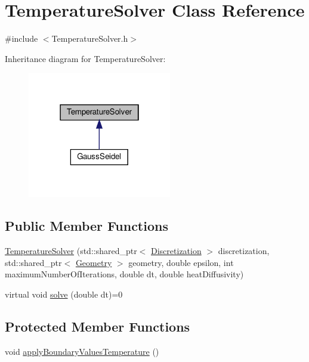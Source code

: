 \hypertarget{classTemperatureSolver}{}\section{Temperature\+Solver Class Reference}
\label{classTemperatureSolver}


{\ttfamily \#include $<$Temperature\+Solver.\+h$>$}



Inheritance diagram for Temperature\+Solver\+:\nopagebreak
\begin{figure}[H]
\begin{center}
\leavevmode
\includegraphics[width=178pt]{classTemperatureSolver__inherit__graph}
\end{center}
\end{figure}
\subsection*{Public Member Functions}
\begin{DoxyCompactItemize}
\item 
\mbox{\hyperlink{classTemperatureSolver_a8e3ca429cd802f7d8753f6e08cb70010}{Temperature\+Solver}} (std\+::shared\+\_\+ptr$<$ \mbox{\hyperlink{classDiscretization}{Discretization}} $>$ discretization, std\+::shared\+\_\+ptr$<$ \mbox{\hyperlink{classGeometry}{Geometry}} $>$ geometry, double epsilon, int maximum\+Number\+Of\+Iterations, double dt, double heat\+Diffusivity)
\item 
virtual void \mbox{\hyperlink{classTemperatureSolver_a6da00c3ea7978b30f1920dc9ea914ed6}{solve}} (double dt)=0
\end{DoxyCompactItemize}
\subsection*{Protected Member Functions}
\begin{DoxyCompactItemize}
\item 
void \mbox{\hyperlink{classTemperatureSolver_a33dd522855ad93bd9fb06a62683df576}{apply\+Boundary\+Values\+Temperature}} ()
\end{DoxyCompactItemize}
